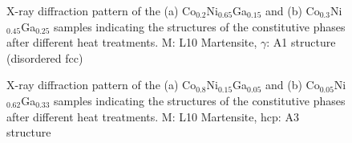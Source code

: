 \documentclass[article]{elsarticle}
\begin{document}
\begin{figure}[!htbp]
\centering
\caption{X-ray diffraction pattern of the (a) Co$_{0.2}$Ni$_{0.65}$Ga$_{0.15}$ and (b) Co$_{0.3}$Ni$_{0.45}$Ga$_{0.25}$ samples indicating the structures of the constitutive phases after different heat treatments. M: L10 Martensite, $\gamma$: A1 structure (disordered fcc)}
\end{figure}
\begin{figure}[!htbp]
\centering
\caption{X-ray diffraction pattern of the (a) Co$_{0.8}$Ni$_{0.15}$Ga$_{0.05}$  and (b) Co$_{0.05}$Ni$_{0.62}$Ga$_{0.33}$ samples indicating the structures of the constitutive phases after different heat treatments. M: L10 Martensite, hcp: A3 structure}
\end{figure}
\end{document}
